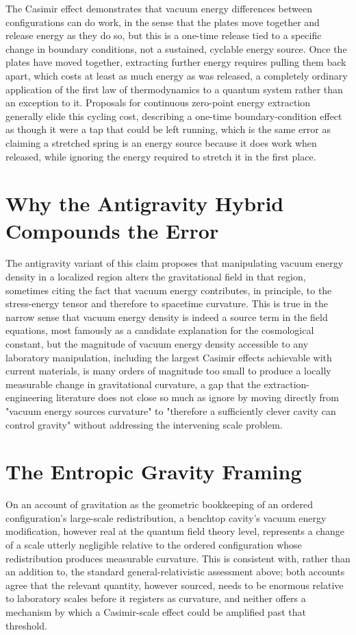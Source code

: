\documentclass[11pt]{article}
\begin{document}
The Casimir effect demonstrates that vacuum energy differences between configurations can do work, in the sense that the plates move together and release energy as they do so, but this is a one-time release tied to a specific change in boundary conditions, not a sustained, cyclable energy source. Once the plates have moved together, extracting further energy requires pulling them back apart, which costs at least as much energy as was released, a completely ordinary application of the first law of thermodynamics to a quantum system rather than an exception to it. Proposals for continuous zero-point energy extraction generally elide this cycling cost, describing a one-time boundary-condition effect as though it were a tap that could be left running, which is the same error as claiming a stretched spring is an energy source because it does work when released, while ignoring the energy required to stretch it in the first place.

\section{Why the Antigravity Hybrid Compounds the Error}

The antigravity variant of this claim proposes that manipulating vacuum energy density in a localized region alters the gravitational field in that region, sometimes citing the fact that vacuum energy contributes, in principle, to the stress-energy tensor and therefore to spacetime curvature. This is true in the narrow sense that vacuum energy density is indeed a source term in the field equations, most famously as a candidate explanation for the cosmological constant, but the magnitude of vacuum energy density accessible to any laboratory manipulation, including the largest Casimir effects achievable with current materials, is many orders of magnitude too small to produce a locally measurable change in gravitational curvature, a gap that the extraction-engineering literature does not close so much as ignore by moving directly from "vacuum energy sources curvature" to "therefore a sufficiently clever cavity can control gravity" without addressing the intervening scale problem.

\section{The Entropic Gravity Framing}

On an account of gravitation as the geometric bookkeeping of an ordered configuration's large-scale redistribution, a benchtop cavity's vacuum energy modification, however real at the quantum field theory level, represents a change of a scale utterly negligible relative to the ordered configuration whose redistribution produces measurable curvature. This is consistent with, rather than an addition to, the standard general-relativistic assessment above; both accounts agree that the relevant quantity, however sourced, needs to be enormous relative to laboratory scales before it registers as curvature, and neither offers a mechanism by which a Casimir-scale effect could be amplified past that threshold.
\end{document}
